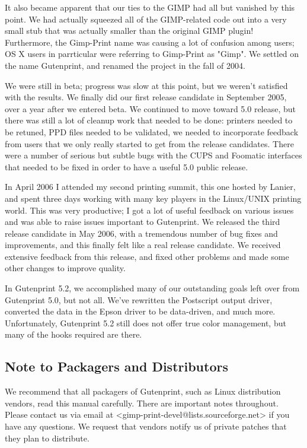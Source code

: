 \documentclass{article}[letter]
\begin{document}
It also became apparent that our ties to the GIMP had all but vanished
by this point. We had actually squeezed all of the GIMP-related code
out into a very small stub that was actually smaller than the original
GIMP plugin! Furthermore, the Gimp-Print name was causing a lot of
confusion among users; OS X users in parrticular were referring to
Gimp-Print as "Gimp". We settled on the name Gutenprint, and renamed
the project in the fall of 2004.

We were still in beta; progress was slow at this point, but we
weren't satisfied with the results. We finally did our first release
candidate in September 2005, over a year after we entered beta. We
continued to move toward 5.0 release, but there was still a lot of
cleanup work that needed to be done: printers needed to be retuned,
PPD files needed to be validated, we needed to incorporate feedback
from users that we only really started to get from the release
candidates. There were a number of serious but subtle bugs with the
CUPS and Foomatic interfaces that needed to be fixed in order to have
a useful 5.0 public release.

In April 2006 I attended my second printing summit, this one hosted by
Lanier, and spent three days working with many key players in the
Linux/UNIX printing world. This was very productive; I got a lot of
useful feedback on various issues and was able to raise issues
important to Gutenprint. We released the third release candidate in
May 2006, with a tremendous number of bug fixes and improvements, and
this finally felt like a real release candidate. We received extensive
feedback from this release, and fixed other problems and made some
other changes to improve quality.

In Gutenprint 5.2, we accomplished many of our outstanding goals left
over from Gutenprint 5.0, but not all. We've rewritten the Postscript
output driver, converted the data in the Epson driver to be
data-driven, and much more. Unfortunately, Gutenprint 5.2 still does
not offer true color management, but many of the hooks required are
there.

\subsection{Note to Packagers and Distributors}

We recommend that all packagers of Gutenprint, such as Linux
distribution vendors, read this manual carefully. There are important
notes throughout. Please contact us via email at
<gimp-print-devel@lists.sourceforge.net> if you have any questions. We
request that vendors notify us of private patches that they plan to
distribute.
\end{document}
